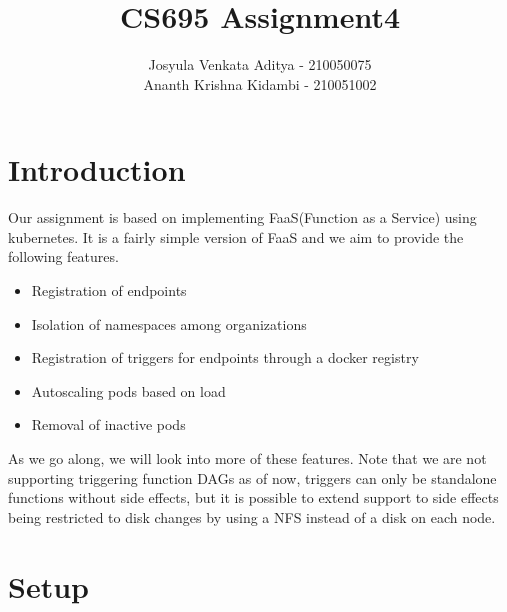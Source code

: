 \documentclass{article}
\title{CS695 Assignment4}
\author{Josyula Venkata Aditya - 210050075 \\ Ananth Krishna Kidambi - 210051002}
\begin{document}
\maketitle

\section{Introduction}
Our assignment is based on implementing FaaS(Function as a Service) using kubernetes. It is a fairly simple version of FaaS and we aim to provide the following features.
\begin{itemize}
    \item Registration of endpoints
    \item Isolation of namespaces among organizations
    \item Registration of triggers for endpoints through a docker registry
    \item Autoscaling pods based on load 
    \item Removal of inactive pods 
\end{itemize}
As we go along, we will look into more of these features. Note that we are not supporting triggering function DAGs as of now, triggers can only be standalone functions without side effects, but it is possible to extend support to side effects being restricted to disk changes by using a NFS instead of a disk on each node.

\section{Setup}
\end{document}
